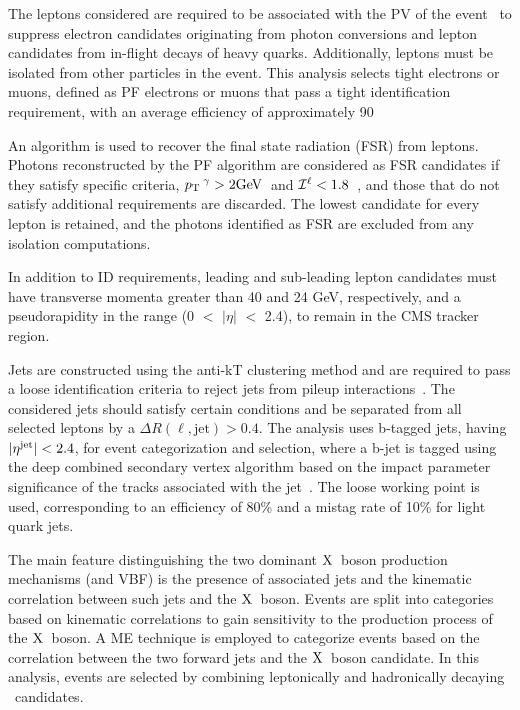 The leptons considered are required to be associated with the PV of the event~\cite{Chatrchyan:2014fea} to suppress electron candidates originating from photon conversions and lepton candidates from in-flight decays of heavy quarks.
Additionally, leptons must be isolated from other particles in the event.
This analysis selects tight electrons or muons, defined as PF electrons or muons that pass a tight identification requirement, with an average efficiency of approximately 90%

An algorithm is used to recover the final state radiation (FSR) from leptons.
Photons reconstructed by the PF algorithm are considered as FSR candidates if they satisfy specific criteria, $p_\mathrm{T}\hspace{0.2em}^{{\gamma}} > 2\mathrm{GeV}\hspace{0.2em}$ and ${\cal I}^{\ell}< 1.8$~\cite{Sirunyan:2017exp}, and those that do not satisfy additional requirements are discarded.
The lowest candidate for every lepton is retained, and the photons identified as FSR are excluded from any isolation computations.

In addition to ID requirements, leading and sub-leading lepton candidates must have transverse momenta greater than 40 and 24 GeV, respectively, and a pseudorapidity in the range (0 $<$ $|\eta|$ $<$ 2.4), to remain in the CMS tracker region.

Jets are constructed using the anti-kT clustering method and are required to pass a loose identification criteria to reject jets from pileup interactions~\cite{antikt,Cacciari:2011ma}.
The considered jets should satisfy certain conditions and be separated from all selected leptons by a $\Delta R(\ell,\text{jet})>0.4$.
The analysis uses b-tagged jets, having $\lvert \eta^{\text{jet}} \rvert<2.4$, for event categorization and selection, where a b-jet is tagged using the deep combined secondary vertex algorithm based on the impact parameter significance of the tracks associated with the jet~\cite{Chatrchyan:2012jua,CMS-PAS-BTV-15-001}. The loose working point is used, corresponding to an efficiency of 80\% and a mistag rate of 10\% for light quark jets.

The main feature distinguishing the two dominant $\mathrm{X}\hspace{0.2em}$ boson production mechanisms (\ggF and VBF) is the presence of associated jets and the kinematic correlation between such jets and the $\mathrm{X}\hspace{0.2em}$ boson.
Events are split into categories based on kinematic correlations to gain sensitivity to the production process of the $\mathrm{X}\hspace{0.2em}$ boson.
A ME technique is employed to categorize events based on the correlation between the two forward jets and the $\mathrm{X}\hspace{0.2em}$ boson candidate.
In this analysis, events are selected by combining leptonically and hadronically decaying \cPZ\ candidates.

